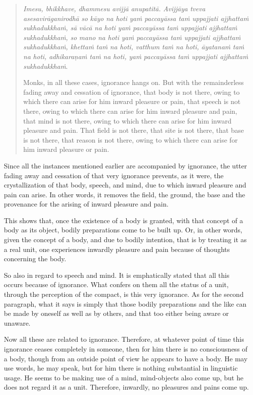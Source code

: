 \begin{quote}
\emph{Imesu, bhikkhave, dhammesu avijjā anupatitā. Avijjāya tveva asesavirāganirodhā so kāyo na hoti yaṁ paccayāssa taṁ uppajjati ajjhattaṁ sukhadukkhaṁ, sā vācā na hoti yaṁ paccayāssa taṁ uppajjati ajjhattaṁ sukhadukkhaṁ, so mano na hoti yaṁ paccayāssa taṁ uppajjati ajjhattaṁ sukhadukkhaṁ, khettaṁ taṁ na hoti, vatthum taṁ na hoti, āyatanaṁ taṁ na hoti, adhikaraṇaṁ taṁ na hoti, yaṁ paccayāssa taṁ uppajjati ajjhattaṁ sukhadukkhaṁ}.

Monks, in all these cases, ignorance hangs on. But with the remainderless fading away and cessation of ignorance, that body is not there, owing to which there can arise for him inward pleasure or pain, that speech is not there, owing to which there can arise for him inward pleasure and pain, that mind is not there, owing to which there can arise for him inward pleasure and pain. That field is not there, that site is not there, that base is not there, that reason is not there, owing to which there can arise for him inward pleasure or pain.
\end{quote}

Since all the instances mentioned earlier are accompanied by ignorance, the utter fading away and cessation of that very ignorance prevents, as it were, the crystallization of that body, speech, and mind, due to which inward pleasure and pain can arise. In other words, it removes the field, the ground, the base and the provenance for the arising of inward pleasure and pain.

This shows that, once the existence of a body is granted, with that concept of a body as its object, bodily preparations come to be built up. Or, in other words, given the concept of a body, and due to bodily intention, that is by treating it as a real unit, one experiences inwardly pleasure and pain because of thoughts concerning the body.

So also in regard to speech and mind. It is emphatically stated that all this occurs because of ignorance. What confers on them all the status of a unit, through the perception of the compact, is this very ignorance. As for the second paragraph, what it says is simply that those bodily preparations and the like can be made by oneself as well as by others, and that too either being aware or unaware.

Now all these are related to ignorance. Therefore, at whatever point of time this ignorance ceases completely in someone, then for him there is no consciousness of a body, though from an outside point of view he appears to have a body. He may use words, he may speak, but for him there is nothing substantial in linguistic usage. He seems to be making use of a mind, mind-objects also come up, but he does not regard it as a unit. Therefore, inwardly, no pleasures and pains come up.


